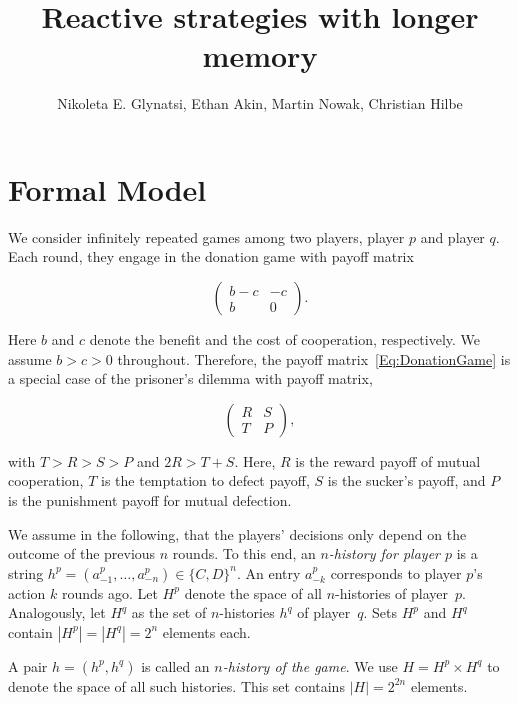 \documentclass{article}
\title{Reactive strategies with longer memory}
\author{Nikoleta E. Glynatsi, Ethan Akin, Martin Nowak, Christian Hilbe}
\date{}
\theoremstyle{definition}
\begin{document}
\maketitle

\section{Formal Model}

We consider infinitely repeated games among two players, player $p$ and
player $q$. Each round, they engage in the donation game with payoff matrix

\begin{equation} \label{Eq:DonationGame}
\left(
\begin{array}{cc}
b-c	&-c\\
b	&0
\end{array}
\right).
\end{equation}

Here $b$ and $c$ denote the benefit and the cost of cooperation, respectively. 
We assume $b\!>\!c\!>\!0$ throughout.
Therefore, the payoff matrix~\eqref{Eq:DonationGame} is a special case of the
prisoner's dilemma with payoff matrix,

\begin{equation} \label{Eq:PrisonerDilemma}
    \left(
    \begin{array}{cc}
    R & S\\
    T & P
    \end{array}
    \right),
\end{equation}

with $T > R > S > P$ and $2 R > T + S$. Here, $R$ is the reward payoff of mutual
cooperation, $T$ is the temptation to defect payoff, $S$ is the sucker's payoff,
and $P$ is the punishment payoff for mutual defection.

We assume in the following, that the players' decisions only depend on the
outcome of the previous $n$ rounds. To this end, an {\it $n$-history for player
$p$} is a string $h^p=(a^p_{-1},\ldots,a^p_{-n})\!\in\!\{C,D\}^n$. An entry
$a^p_{-k}$ corresponds to player $p$'s action $k$ rounds ago. Let $H^p$ denote
the space of all $n$-histories of player~$p$. Analogously, let $H^q$ as the set
of $n$-histories $h^q$ of player~$q$. Sets $H^p$ and $H^q$ contain
$|H^p|=|H^q|=2^{n}$ elements each.

A pair $h\!=\!(h^p,h^q)$ is called an {\it $n$-history of the game}. We use
$H=H^p\times H^q$ to denote the space of all such histories. This set contains
$|H|=2^{2n}$ elements.
\end{document}
